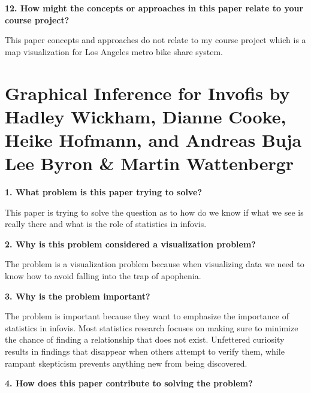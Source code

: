 \documentclass{article}[12pt]
\begin{document}
\vspace{2ex}\noindent
{\bf 12. How might the concepts or approaches in this paper relate to your course project? }

{
    This paper concepts and approaches do not relate to my course project which is a map visualization for Los Angeles metro bike share system. 

}
\hfill \break
\section{Graphical Inference for Invofis by Hadley Wickham, Dianne Cooke, Heike Hofmann, and Andreas Buja
Lee Byron \& Martin Wattenbergr}
\hfill \break
\noindent
{\bf 1. What problem is this paper trying to solve?}

{
    This paper is trying to solve the question as to how do we know if what we see is really there and what is the role of statistics in infovis.
}




\vspace{2ex}\noindent
{\bf 2. Why is this problem considered a visualization problem?}

{
   The problem is a visualization problem because when visualizing data we need to know how to avoid falling into the trap of apophenia.
}




\vspace{2ex}\noindent
{\bf 3. Why is the problem important? }

{
    The problem is important because they want to emphasize the importance of statistics in infovis. Most statistics research focuses on making sure to minimize the chance of finding a relationship that does not exist. Unfettered curiosity results in findings that disappear when others attempt to verify them, while rampant skepticism prevents anything new from being discovered.
}




\vspace{2ex}\noindent
{ \bf 4. How does this paper contribute to solving the problem? }
\end{document}
